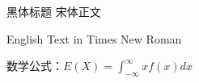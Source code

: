 \documentclass{shnu-exam}
\begin{document}
{\heiti 黑体标题} {\songti 宋体正文}

English Text in Times New Roman

数学公式：$E(X) = \int_{-\infty}^{\infty} x f(x) dx$

\clearpage
\lipsum[1-20]
\end{document}
